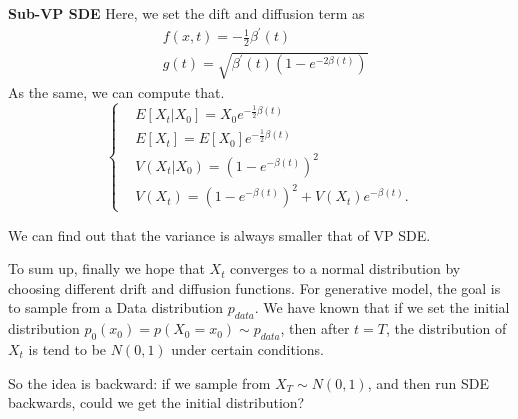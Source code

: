 \textbf{Sub-VP SDE}
Here, we set the dift and diffusion term as
\begin{equation}
\begin{aligned}
        &f(x, t)=-\frac{1}{2} \beta^{\prime}(t) \\
        &g(t)=\sqrt{\beta^{\prime}(t)\left(1-e^{-2 \beta(t)}\right)}
\end{aligned}
\end{equation}
As the same, we can compute that.
\begin{equation}
    \left\{\begin{aligned}
    &E\left[X_{t} | X_{0}\right]=X_{0} e^{-\frac{1}{2} \beta(t)} \\
    &E\left[X_{t}\right]=E\left[X_{0}\right] e^{-\frac{1}{2} \beta(t)} \\
    &V\left(X_{t} | X_{0}\right)=\left(1-e^{-\beta(t)}\right)^{2} \\
    &V\left(X_{t}\right)=\left(1-e^{-\beta(t)}\right)^{2}+V\left(X_{t}\right) e^{-\beta(t)} .
    \end{aligned}\right.
\end{equation}

We can find out that the variance is always smaller that of VP SDE.

\begin{remark}
    To sum up, finally we hope that $X_t$ converges to a normal distribution by choosing different drift and diffusion functions. 
    For generative model, the goal is to sample from a Data distribution $p_{data}$. We have known that if we set the initial distribution $p_0(x_0)=p(X_0=x_0)\sim p_{data}$, 
    then after $t=T$, the distribution of $X_t$ is tend to be $N(0, 1)$ under certain conditions. 
    
    So the idea is backward: if we sample from $X_T\sim N(0, 1)$, and then run SDE backwards, could we get the initial distribution?
\end{remark}

